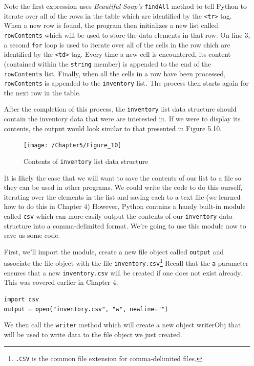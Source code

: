 \documentclass{book}
\begin{document}
Note the first expression uses \textit{Beautiful Soup's} \texttt{findAll} method to tell Python to iterate over all of the rows in the table which are identified by the \texttt{<tr>} tag. When a new row is found, the program then initializes a new list called \texttt{rowContents} which will be used to store the data elements in that row. On line 3, a second \texttt{for} loop is used to iterate over all of the cells in the row chich are identified by the \texttt{<td>} tag. Every time a new cell is encountered, its content (contained within the \texttt{string} member) is appended to the end of the \texttt{rowContents} list. Finally, when all the cells in a row have been processed, \texttt{rowContents} is appended to the \texttt{inventory} list. The process then starts again for the next row in the table. 

After the completion of this process, the \texttt{inventory} list data structure should contain the inventory data that were are interested in. If we were to display its contents, the output would look similar to that presented in Figure 5.10.

\begin{figure}[h]
	\caption{Contents of \texttt{inventory} list data structure}
	\centering\texttt{[image: /Chapter5/Figure\_10]}
\end{figure}

It is likely the case that we will want to save the contents of our list to a file so they can be used in other programs. We could write the code to do this ourself, iterating over the elements in the list and saving each to a text file (we learned how to do this in Chapter 4) However, Python contains a handy built-in module called \texttt{csv} which can more easily output the contents of our \texttt{inventory} data structure into a comma-delimited format. We're going to use this module now to save us some code.

First, we'll import the module, create a new file object called \texttt{output} and associate the file object with the file \texttt{inventory.csv}\footnote{\texttt{.CSV} is the common file extension for comma-delimited files.} Recall that the \texttt{a} parameter ensures that a new \texttt{inventory.csv} will be created if one does not exist already. This was covered earlier in Chapter 4.

\texttt{import csv} \\
\texttt{output = open("inventory.csv", "w", newline="")}

We then call the \texttt{writer} method which will create a new object {writerObj} that will be used to write data to the file object we just created.
\end{document}
